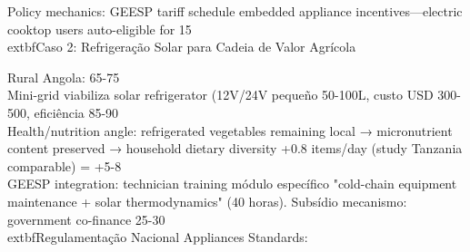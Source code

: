 \documentclass[12pt, a4paper]{article}
\begin{document}
{{{{{{{{{{{{Policy mechanics: GEESP tariff schedule embedded appliance incentives—electric cooktop users auto-eligible for 15\\%

	extbf{Caso 2: Refrigeração Solar para Cadeia de Valor Agrícola}

Rural Angola: 65-75\\%

Mini-grid viabiliza solar refrigerator (12V/24V pequeño 50-100L, custo USD 300-500, eficiência 85-90\\%

Health/nutrition angle: refrigerated vegetables remaining local → micronutrient content preserved → household dietary diversity +0.8 items/day (study Tanzania comparable) = +5-8\\%

GEESP integration: technician training módulo específico "cold-chain equipment maintenance + solar thermodynamics" (40 horas). Subsídio mecanismo: government co-finance 25-30\\%

	extbf{Regulamentação Nacional Appliances Standards:}

}}}}}}}}}}}}
\end{document}
